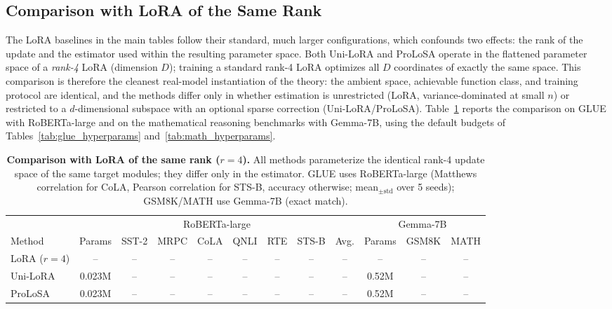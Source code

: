 
\subsection{Comparison with LoRA of the Same Rank}
\label{app:same_rank}

The LoRA baselines in the main tables follow their standard, much larger configurations, which confounds two effects: the rank of the update and the estimator used within the resulting parameter space.
Both Uni-LoRA and ProLoSA operate in the flattened parameter space of a \emph{rank-4} LoRA (dimension $D$); training a standard rank-4 LoRA optimizes all $D$ coordinates of exactly the same space.
This comparison is therefore the cleanest real-model instantiation of the theory: the ambient space, achievable function class, and training protocol are identical, and the methods differ only in whether estimation is unrestricted (LoRA, variance-dominated at small $n$) or restricted to a $d$-dimensional subspace with an optional sparse correction (Uni-LoRA/ProLoSA).
Table~\ref{tab:same_rank} reports the comparison on GLUE with RoBERTa-large and on the mathematical reasoning benchmarks with Gemma-7B, using the default budgets of Tables~\ref{tab:glue_hyperparams} and~\ref{tab:math_hyperparams}.

\begin{table}[htbp]
\centering
\small
\setlength{\tabcolsep}{4pt}
\caption{\textbf{Comparison with LoRA of the same rank ($r=4$).} All methods parameterize the identical rank-4 update space of the same target modules; they differ only in the estimator. GLUE uses RoBERTa-large (Matthews correlation for CoLA, Pearson correlation for STS-B, accuracy otherwise; mean$_{\pm\mathrm{std}}$ over 5 seeds); GSM8K/MATH use Gemma-7B (exact match).}
\label{tab:same_rank}
\begin{tabular}{lcccccccc|ccc}
\toprule
& \multicolumn{8}{c|}{RoBERTa-large} & \multicolumn{3}{c}{Gemma-7B} \\
\cmidrule(lr){2-9}\cmidrule(lr){10-12}
Method & Params & SST-2 & MRPC & CoLA & QNLI & RTE & STS-B & Avg. & Params & GSM8K & MATH \\
\midrule
LoRA ($r=4$) & -- & -- & -- & -- & -- & -- & -- & -- & -- & -- & -- \\
Uni-LoRA     & 0.023M & -- & -- & -- & -- & -- & -- & -- & 0.52M & -- & -- \\
ProLoSA      & 0.023M & -- & -- & -- & -- & -- & -- & -- & 0.52M & -- & -- \\
\bottomrule
\end{tabular}
\end{table}

